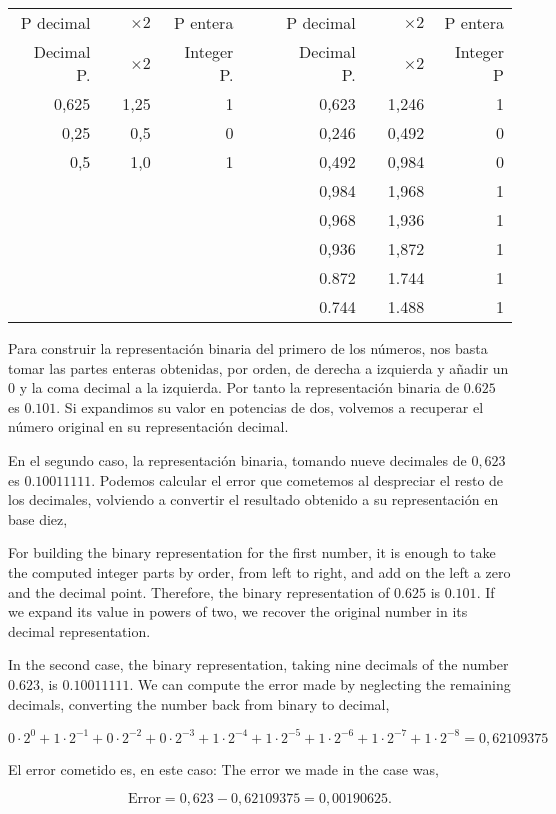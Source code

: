 \begin{table}[h]
	\centering
\begin{tabular}{|r|r|r|r|r r|r|r|r|r|}
P decimal& &$\times 2$& P entera& &&P decimal& &$\times 2$& P entera\\
Decimal P.& &$\times 2$&Integer P.& && Decimal P.& &$\times 2$& Integer P\\  
\cline{1-4}
\cline{7-10}
0,625& &1,25&1& &&0,623& &1,246&1\\
0,25  & &0,5  &0& &&0,246& &0,492&0\\
0,5    & &1,0  &1& &&0,492& &0,984&0\\
         & &       &  & &&0,984& &1,968&1\\
         & &       &  & &&0,968& &1,936&1\\
         & &       &  & &&0,936& &1,872&1\\
         & &       &  & &&0.872& &1.744&1\\
         & &       &  & &&0.744& &1.488&1\\
\end{tabular}
\end{table}
\begin{paracol}{2}
Para construir la representación binaria del primero de los números, nos basta tomar las partes enteras obtenidas, por orden, de derecha a izquierda y añadir un $0$ y la coma decimal a la izquierda. Por tanto  la representación binaria de $0.625$ es $0.101$.  Si expandimos su valor en potencias de dos, volvemos a recuperar el número original en su representación decimal.

 En el segundo caso, la representación binaria, tomando nueve decimales de $0,623$ es $0.10011111$. Podemos calcular el error que cometemos al despreciar el resto de los decimales, volviendo a convertir el resultado obtenido a su representación en base diez,
 
 \switchcolumn
 For building the binary representation for the first number, it is enough to take the computed integer parts by order, from left to right, and add on the left a zero and the decimal point. Therefore, the binary representation of $0.625$ is $0.101$. If we expand its value in powers of two, we recover the original number in its decimal representation.
 
 In the second case, the binary representation, taking nine decimals of the number $0.623$, is $0.10011111$. We can compute the error made by neglecting the remaining decimals, converting the number back from binary to decimal,   

\end{paracol}
 \begin{equation*}
0\cdot 2^{0}+1\cdot 2^{-1}+0\cdot 2^{-2}+ 0\cdot 2^{-3}+1\cdot 2^{-4}+1\cdot 2^{-5}+ 1\cdot 2^{-6}+1\cdot 2^{-7}+1\cdot 2^{-8}=0,62109375
\end{equation*} 
\begin{paracol}{2}
El error cometido es, en este caso: 
\switchcolumn
The error we made in the case was,
\end{paracol}
\begin{equation*}
\text{Error}=0,623-0,62109375=0,00190625.
\end{equation*}
  
